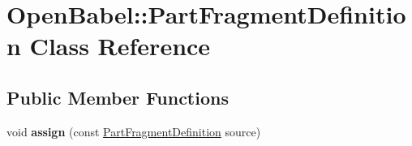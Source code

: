 \hypertarget{class_open_babel_1_1_part_fragment_definition}{\section{Open\-Babel\-:\-:Part\-Fragment\-Definition Class Reference}
\label{class_open_babel_1_1_part_fragment_definition}
}
\subsection*{Public Member Functions}
\begin{DoxyCompactItemize}
\item 
\hypertarget{class_open_babel_1_1_part_fragment_definition_a5d58dcd77801b0cd35a72a96484ae923}{void {\bfseries assign} (const \hyperlink{class_open_babel_1_1_part_fragment_definition}{Part\-Fragment\-Definition} source)}\label{class_open_babel_1_1_part_fragment_definition_a5d58dcd77801b0cd35a72a96484ae923}

\end{DoxyCompactItemize}
